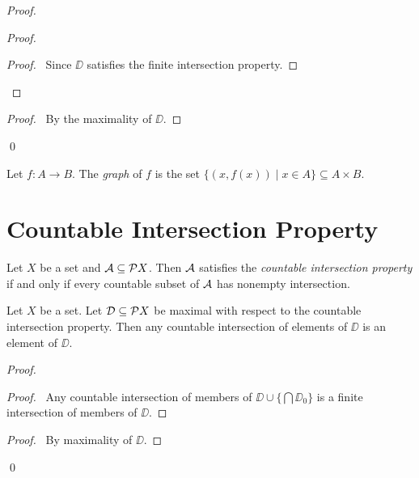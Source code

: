 \begin{proof}
    \pf
    \begin{proof}
        \begin{proof}
            \pf\ Since $\DD$ satisfies the finite intersection property.
        \end{proof}
    \end{proof}
    \begin{proof}
        \pf\ By the maximality of $\DD$.
    \end{proof}
    \qed
\end{proof}

\begin{definition}[Graph]
    Let $f : A \rightarrow B$. The \emph{graph} of $f$ is the set $\{ (x, f(x)) \mid x \in A \} \subseteq A \times B$.
\end{definition}

\section{Countable Intersection Property}

\begin{definition}
    Let $X$ be a set and $\AA \subseteq \pow X$. Then $\AA$ satisfies the \emph{countable intersection property}
    if and only if every countable subset of $\AA$ has nonempty intersection.
\end{definition}

\begin{lemma}
    \label{lemma:countable_intersection_maximal}
    Let $X$ be a set. Let $\DD \subseteq \pow X$ be maximal with respect to the countable intersection property.
    Then any countable intersection of elements of $\DD$ is an element of $\DD$.
\end{lemma}

\begin{proof}
    \pf
    \begin{proof}
        \pf\ Any countable intersection of members of $\DD \cup \{ \bigcap \DD_0 \}$
        is a finite intersection of members of $\DD$.
    \end{proof}
    \begin{proof}
        \pf\ By maximality of $\DD$.
    \end{proof}
    \qed
\end{proof}

